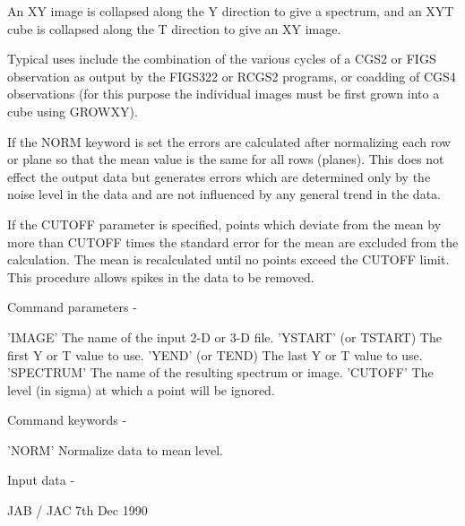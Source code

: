 \begin{description}
\begin{terminalv}
 An XY image is collapsed along the Y direction to give a spectrum,
 and an XYT cube is collapsed along the T direction to give an XY image.

 Typical uses include the combination of the various cycles of a
 CGS2 or FIGS observation as output by the FIGS322 or RCGS2 programs,
 or coadding of CGS4 observations (for this purpose the individual images
 must be first grown into a cube using GROWXY).

 If the NORM keyword is set the errors are calculated after
 normalizing each row or plane so that the mean value is the same
 for all rows (planes). This does not effect the output data but
 generates errors which are determined only by the noise level in the
 data and are not influenced by any general trend in the data.

 If the CUTOFF parameter is specified, points which deviate from the
 mean by more than CUTOFF times the standard error for the mean are
 excluded from the calculation. The mean is recalculated until no
 points exceed the CUTOFF limit. This procedure allows spikes in the
 data to be removed.

 Command parameters -

 'IMAGE'    The name of the input 2-D or 3-D file.
 'YSTART'   (or TSTART) The first Y or T value to use.
 'YEND'     (or TEND) The last Y or T value to use.
 'SPECTRUM' The name of the resulting spectrum or image.
 'CUTOFF'   The level (in sigma) at which a point will
            be ignored.

 Command keywords -

 'NORM'     Normalize data to mean level.

 Input data -

                                 JAB / JAC 7th Dec 1990
\end{terminalv}
\end{description}
